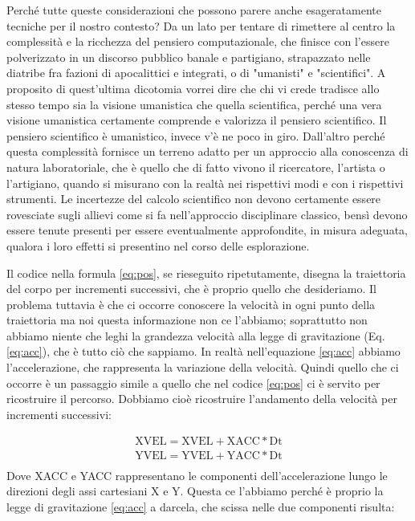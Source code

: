 Perché tutte queste considerazioni che possono parere anche esageratamente tecniche per il nostro contesto? Da un lato per tentare di rimettere al centro la complessità e la ricchezza del pensiero computazionale, che finisce con l'essere polverizzato in un discorso pubblico banale e partigiano, strapazzato nelle diatribe fra fazioni di apocalittici e integrati, o di "umanisti" e "scientifici". A proposito di quest'ultima dicotomia vorrei dire che chi vi crede tradisce allo stesso tempo sia la visione umanistica che quella scientifica, perché una vera visione umanistica certamente comprende e valorizza il pensiero scientifico. Il pensiero scientifico è umanistico, invece v'è ne poco in giro. Dall'altro perché questa complessità fornisce un terreno adatto per un approccio alla conoscenza di natura laboratoriale, che è quello che di fatto vivono il ricercatore, l'artista o l'artigiano, quando si misurano con la realtà nei rispettivi modi e con i rispettivi strumenti. Le incertezze del calcolo scientifico non devono certamente essere rovesciate sugli allievi come si fa nell'approccio disciplinare classico, bensì devono essere tenute presenti per essere eventualmente approfondite, in misura adeguata, qualora i loro effetti si presentino nel corso delle esplorazione.

Il codice nella formula \ref{eq:pos}, se rieseguito ripetutamente, disegna la traiettoria del corpo per incrementi successivi, che è proprio quello che desideriamo. Il problema tuttavia è che ci occorre conoscere la velocità in ogni punto della traiettoria ma noi questa informazione non ce l'abbiamo; soprattutto non abbiamo niente che leghi la grandezza velocità alla legge di gravitazione (Eq. \ref{eq:acc}), che è tutto ciò che sappiamo. In realtà nell'equazione \ref{eq:acc} abbiamo l'accelerazione, che rappresenta la variazione della velocità. Quindi quello che ci occorre è un passaggio simile a quello che nel codice \ref{eq:pos} ci è servito per ricostruire il percorso. Dobbiamo cioè ricostruire l'andamento della velocità per incrementi successivi:

\begin{equation} \label{eq:vel}
\begin{array}{ll}
\textrm{XVEL}=\textrm{XVEL}+\textrm{XACC}*\textrm{Dt}\\
\textrm{YVEL}=\textrm{YVEL}+\textrm{YACC}*\textrm{Dt}\\
\end{array}
\end{equation}
Dove XACC e YACC rappresentano le componenti dell'accelerazione lungo le direzioni degli assi cartesiani X e Y. Questa  ce l'abbiamo perché è proprio la legge di gravitazione \ref{eq:acc} a darcela, che scissa nelle due componenti risulta:

